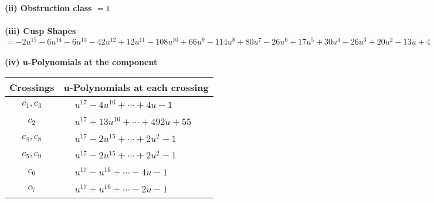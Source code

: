 \documentclass[1p]{elsarticle_modified}
\theoremstyle{definition}
\begin{document}
\flushleft \textbf{(ii) Obstruction class $= 1$}\\~\\
\flushleft \textbf{(iii) Cusp Shapes $= -2 u^{15}-6 u^{14}-6 u^{13}-42 u^{12}+12 u^{11}-108 u^{10}+66 u^9-114 u^8+80 u^7-26 u^6+17 u^5+30 u^4-26 u^3+20 u^2-13 u+4$}\\~\\
\newpage\renewcommand{\arraystretch}{1}
\flushleft \textbf{(iv) u-Polynomials at the component}\newline \\
\begin{tabular}{m{50pt}|m{274pt}}
Crossings & \hspace{64pt}u-Polynomials at each crossing \\
\hline $$\begin{aligned}c_{1},c_{3}\end{aligned}$$&$\begin{aligned}
&u^{17}-4 u^{16}+\cdots+4 u-1
\end{aligned}$\\
\hline $$\begin{aligned}c_{2}\end{aligned}$$&$\begin{aligned}
&u^{17}+13 u^{16}+\cdots+492 u+55
\end{aligned}$\\
\hline $$\begin{aligned}c_{4},c_{8}\end{aligned}$$&$\begin{aligned}
&u^{17}-2 u^{15}+\cdots+2 u^2-1
\end{aligned}$\\
\hline $$\begin{aligned}c_{5},c_{9}\end{aligned}$$&$\begin{aligned}
&u^{17}-2 u^{15}+\cdots+2 u^2-1
\end{aligned}$\\
\hline $$\begin{aligned}c_{6}\end{aligned}$$&$\begin{aligned}
&u^{17}- u^{16}+\cdots-4 u-1
\end{aligned}$\\
\hline $$\begin{aligned}c_{7}\end{aligned}$$&$\begin{aligned}
&u^{17}+u^{16}+\cdots-2 u-1
\end{aligned}$\\

\end{tabular}
\end{document}
